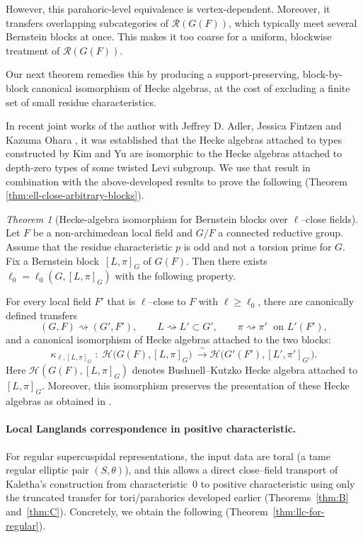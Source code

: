 \documentclass[american]{article}
\numberwithin{equation}{section}
\numberwithin{figure}{section}
\theoremstyle{plain}
\theoremstyle{definition}
\theoremstyle{remark}
\newcounter{thmA}
\newtheorem{theoremA}[thmA]{Theorem}
\newcommand{\cR}{\mathcal{R}}
\begin{document}
However, this parahoric-level equivalence is vertex-dependent. Moreover, it transfers overlapping
subcategories of $\cR(G(F))$, which typically meet several Bernstein blocks at once. This makes it
too coarse for a uniform, blockwise treatment of $\cR(G(F))$.

Our next theorem remedies this by producing a support-preserving, block-by-block canonical
isomorphism of Hecke algebras, at the cost of excluding a finite set of small residue characteristics.



In recent joint works of the author with Jeffrey D. Adler, Jessica Fintzen and Kazuma Ohara \cite{AFMO24a}\cite{AFMO24b}, it was established that the Hecke algebras attached to types constructed by Kim and Yu are isomorphic to the Hecke algebras attached to depth-zero types of some twisted Levi subgroup. We use that result in combination with the above-developed results to prove the following (Theorem \ref{thm:ell-close-arbitrary-blocks}).

\begin{theoremA}[Hecke-algebra isomorphism for Bernstein blocks over $\ell$--close fields]\label{thm:F}
Let $F$ be a non-archimedean local field and $G/F$ a connected reductive group. Assume that the residue characteristic  $p$ is odd and not a torsion prime for $G$. Fix a Bernstein block $\,[L,\pi]_G$ of $G(F)$. Then there exists $\ell_0=\ell_0(G,[L,\pi]_G)$ with the following property.

For every local field $F'$ that is $\ell$--close to $F$ with $\ell\ge\ell_0$, there are canonically defined transfers
\[
(G,F)\rightsquigarrow (G',F'),\qquad
L\rightsquigarrow L'\subset G',\qquad
\pi\rightsquigarrow \pi'\;\text{ on }L'(F'),
\]
and a canonical isomorphism of Hecke algebras attached to the two blocks:
\[
\kappa_{\ell,[L,\pi]_G}\;:\;
\mathcal{H}\!\bigl(G(F),[L,\pi]_G\bigr)\ \xrightarrow{\;\sim\;}
\mathcal{H}\!\bigl(G'(F'),[L',\pi']_{G'}\bigr).
\]
Here $\mathcal{H}(G(F),[L,\pi]_G)$ denotes Bushnell--Kutzko Hecke algebra attached to \([L,\pi]_G\). Moreover, this isomorphism preserves the presentation of these Hecke algebras as obtained in \cite[5.3.6]{AFMO24a}.
\end{theoremA}
\paragraph{Local Langlands correspondence in positive characteristic.}
For regular supercuspidal representations, the input data are toral (a tame regular elliptic pair
$(S,\theta)$), and this allows a direct close--field transport of Kaletha's construction from
characteristic~$0$ to positive characteristic using only the truncated transfer for tori/parahorics
developed earlier (Theorems~\ref{thm:B} and~\ref{thm:C}).
Concretely, we obtain the following (Theorem~\ref{thm:llc-for-regular}).
\end{document}
